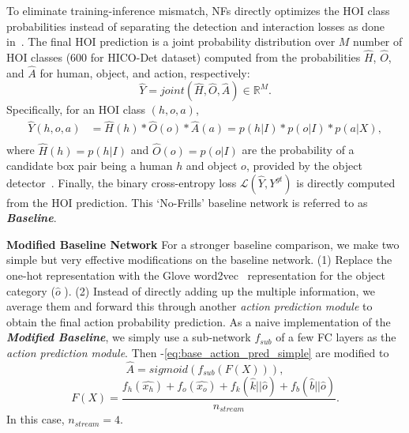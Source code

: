 To eliminate training-inference mismatch, NFs directly optimizes the HOI class probabilities instead of separating the detection and interaction losses as done in~\cite{gao2018ican,gkioxari2018detecting}. The final HOI prediction is a joint probability distribution over $M$ number of HOI classes (600 for HICO-Det dataset)  {computed from the probabilities $\hat{H}$, $\hat{O}$, and $\hat{A}$ for human, object, and action, respectively:}
\begin{equation}
    \hat{Y} = joint(\hat{H}, \hat{O}, \hat{A}) \in \mathbb{R}^{M}.
\end{equation}
Specifically, for an HOI class $(h,o,a)$,
\begin{equation}
\begin{split}
\hat{Y} (h,o,a) & = \hat{H}(h) * \hat{O}(o) * \hat{A}(a) = p(h|I) * p(o|I) * p(a|X),\\
\end{split}
    \label{eq:base_hoi_pred}
\end{equation}
where $\hat{H}(h)=p(h|I)$ and $\hat{O}(o)=p(o|I)$ are the probability of a candidate box pair being a human $h$ and object $o$, provided by the object detector~\cite{ren2015faster}. Finally, the binary cross-entropy loss $\mathcal{L}(\hat{Y}, Y^{gt})$ is directly computed from the HOI prediction.
This ‘No-Frills’ baseline network is referred to as \emph{\textbf{Baseline}}.



\noindent\textbf{Modified Baseline Network} 
{For a stronger baseline comparison,}
we make two {simple} but very effective modifications on the baseline network.
(1) Replace the one-hot representation with the Glove word2vec~\cite{pennington2014glove} representation for the object category ($\hat{o}$ ).
(2) Instead of directly adding up the multiple information, we average them and forward this through another \emph{action prediction module}
to obtain the final action probability prediction. As a naive implementation of the \emph{\textbf{Modified  Baseline}}, we simply use a sub-network $f_{sub}$ of a few FC layers as the \emph{action prediction module}.
Then -\ref{eq:base_action_pred_simple} are modified to
\begin{equation}
\hat{A} = 
sigmoid(f_{sub}(F(X))),
 \label{eq:modified}
\end{equation}
 \begin{equation}
 F(X) = \dfrac{f_h(\hat{x_h}) + f_o(\hat{x_o}) + f_k(\hat{k}||\hat{o})+ f_b(\hat{b}||\hat{o})}{n_{stream}}.
 \end{equation}
 In this case, $n_{stream}=4$. 

